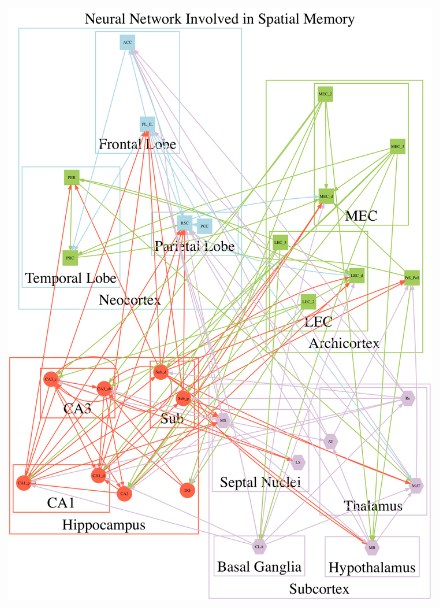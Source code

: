\documentclass[doc, longtable]{apa6}
\begin{document}
\begin{figure}[htp!]
\captionsetup{labelformat=empty}
\centering
\includegraphics[width=.95\textwidth]{Complicated.png}
\begin{singlespace}
\caption {}
\end{singlespace}
\end{figure}
\clearpage
\end{document}
